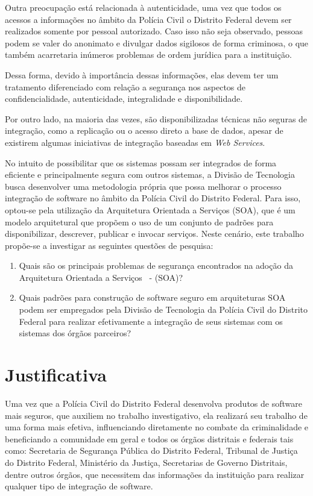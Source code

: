 Outra preocupação está relacionada à autenticidade, uma vez que todos os acessos a informações no âmbito da Polícia Civil o Distrito Federal devem ser realizados somente por pessoal autorizado. Caso isso não seja observado, pessoas podem se valer do anonimato e divulgar dados sigilosos de forma criminosa, o que também acarretaria inúmeros problemas de ordem jurídica para a instituição.

Dessa forma, devido à importância dessas informações, elas devem ter um tratamento diferenciado com relação a segurança nos aspectos de confidencialidade, autenticidade, integralidade e disponibilidade.

Por outro lado, na maioria das vezes, são disponibilizadas técnicas não seguras de integração, como a replicação ou o acesso direto a base de dados, apesar de existirem algumas iniciativas de integração baseadas em \emph{Web Services}.

No intuito de possibilitar que os sistemas possam ser integrados de forma eficiente e principalmente segura com outros sistemas, a Divisão de Tecnologia busca desenvolver uma metodologia própria que possa melhorar o processo integração de software no âmbito da Polícia Civil do Distrito Federal.
Para isso, optou-se pela utilização da Arquitetura Orientada a Serviços (SOA), que é um modelo arquitetural que propõem o uso de um conjunto de padrões para disponibilizar, descrever, publicar e invocar serviços. Neste cenário, este trabalho propõe-se a investigar as seguintes questões de pesquisa:

\begin{enumerate}
	\item Quais são os principais problemas de segurança encontrados na adoção da Arquitetura Orientada a Serviços \ - (SOA)?
	\item Quais padrões para construção de software seguro em arquiteturas SOA podem ser empregados pela Divisão de Tecnologia da Polícia Civil do Distrito Federal para realizar efetivamente a integração de seus sistemas com os sistemas dos órgãos parceiros?
\end{enumerate}


\section{Justificativa}

Uma vez que a Polícia Civil do Distrito Federal desenvolva produtos de software mais seguros, que auxiliem no trabalho investigativo, ela realizará seu trabalho de uma forma mais efetiva, influenciando diretamente no combate da criminalidade e beneficiando a comunidade em geral e todos os órgãos distritais e federais tais como: Secretaria de Segurança Pública do Distrito Federal, Tribunal de Justiça do Distrito Federal, Ministério da Justiça, Secretarias de Governo Distritais, dentre outros órgãos, que necessitem das informações da instituição para realizar qualquer tipo de integração de software.


